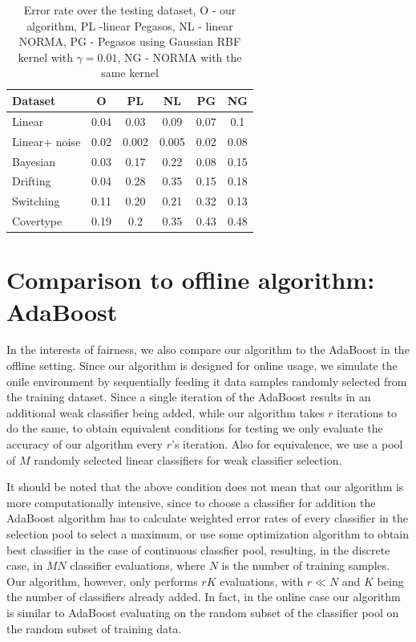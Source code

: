\begin{table}
\centering
\begin{tabular}{| p{1.5cm}|  c |  c | c | c | c |}
\hline
 Dataset & O & PL & NL & PG & NG \\ \hline
Linear& 0.04 & 0.03 & 0.09 &0.07 &0.1 \\ \hline
Linear+ noise & 0.02 & 0.002 & 0.005 & 0.02 & 0.08 \\ \hline
Bayesian & 0.03 &0.17 & 0.22 & 0.08 & 0.15 \\ \hline
Drifting & 0.04 & 0.28 & 0.35 & 0.15&0.18 \\ \hline
Switching & 0.11 & 0.20 &0.21 & 0.32 & 0.13  \\ \hline
Covertype & 0.19 & 0.2 & 0.35 & 0.43 & 0.48 \\
\hline
\end{tabular}

\caption[Comparison to NORMA and Pegasos: Error rate over testing dataset]{Error rate over the testing dataset, O - our algorithm, PL -linear Pegasos, NL - linear NORMA, PG - Pegasos using Gaussian RBF kernel with $\gamma=0.01$, NG - NORMA with the same kernel}
\label{GenError}
\end{table}

\section{Comparison to offline algorithm: AdaBoost}
\label{AdaCompare}
In the interests of fairness, we also compare our algorithm to the AdaBoost in the offline setting. Since our algorithm is designed for online usage, we simulate the onile environment by sequentially feeding it data samples randomly selected from the training dataset. Since a single iteration of the AdaBoost results in an additional weak classifier being added, while our algorithm takes $r$ iterations to do the same, to obtain equivalent conditions for testing we only evaluate the accuracy of our algorithm every $r$'s iteration. Also for equivalence, we use a pool of $M$ randomly selected linear classifiers for weak classifier selection.

It should be noted that the above condition does not mean that our algorithm is more computationally intensive, since to choose a classifier for addition the AdaBoost algorithm has to calculate weighted error rates of every classifier in the selection pool to select a maximum, or use some optimization algorithm to obtain best classifier in the case of continuous classfier pool, resulting, in the discrete case, in $MN$ classifier evaluations, where $N$ is the number of training samples. Our algorithm, however, only performs $rK$ evaluations,  with $r \ll N$ and $K$ being the number of classifiers already added.  In fact,  in the online case our algorithm is similar to AdaBoost evaluating on the random subset of the classifier pool on the random subset of training data. 

